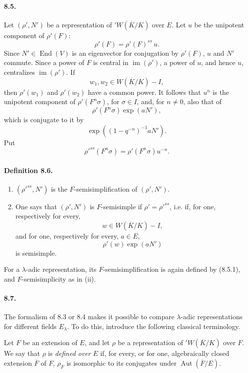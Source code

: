 \documentclass[10pt]{article}
\providecommand{\im}{\operatorname{im}}
\providecommand{\Aut}{\operatorname{Aut}}
\providecommand{\End}{\operatorname{End}}
\providecommand{\im}{\operatorname{im}}
\providecommand{\im}{\operatorname{im}}
\providecommand{\End}{\operatorname{End}}
\begin{document}
\paragraph{8.5.} Let \((\rho',N')\) be a representation of \({}'W(\overline K/K)\) over \(E\). Let \(u\) be the unipotent component of \(\rho'(F)\):
\[
\rho'(F)=\rho'(F)^{ss}\,u.
\]
Since \(N'\in\End(V)\) is an eigenvector for conjugation by \(\rho'(F)\), \(u\) and \(N'\) commute. Since a power of \(F\) is central in \(\im(\rho')\), a power of \(u\), and hence \(u\), centralizes \(\im(\rho')\). If
\[
w_1,w_2\in W(\overline K/K)-I,
\]
then \(\rho'(w_1)\) and \(\rho'(w_2)\) have a common power. It follows that \(u^n\) is the unipotent component of \(\rho'(F^n\sigma)\), for \(\sigma\in I\), and, for \(n\ne0\), also that of
\[
\rho'(F^n\sigma)\exp(aN'),
\]
which is conjugate to it by
\[
\exp((1-q^{-n})^{-1}aN').
\]
Put
\[
\tag{8.5.1}
\rho'^{ss}(F^n\sigma)=\rho'(F^n\sigma)u^{-n}.
\]

\paragraph{Definition 8.6.}
\begin{enumerate}[label=(\roman*)]
\item \((\rho'^{ss},N')\) is the \(F\)-semisimplification of \((\rho',N')\).
\item One says that \((\rho',N')\) is \(F\)-semisimple if \(\rho'=\rho'^{ss}\), i.e. if, for one, respectively for every,
\[
w\in W(\overline K/K)-I,
\]
and for one, respectively for every, \(a\in E\),
\[
\rho'(w)\exp(aN')
\]
is semisimple.
\end{enumerate}
For a \(\lambda\)-adic representation, its \(F\)-semisimplification is again defined by (8.5.1), and \(F\)-semisimplicity as in (ii).

\paragraph{8.7.} The formalism of 8.3 or 8.4 makes it possible to compare \(\lambda\)-adic representations for different fields \(E_\lambda\). To do this, introduce the following classical terminology.

Let \(F\) be an extension of \(E\), and let \(\rho\) be a representation of \({}'W(\overline K/K)\) over \(F\). We say that \(\rho\) is \emph{defined over} \(E\) if, for every, or for one, algebraically closed extension \(\overline F\) of \(F\), \(\rho_{\overline F}\) is isomorphic to its conjugates under \(\Aut(\overline F/E)\).
\end{document}
